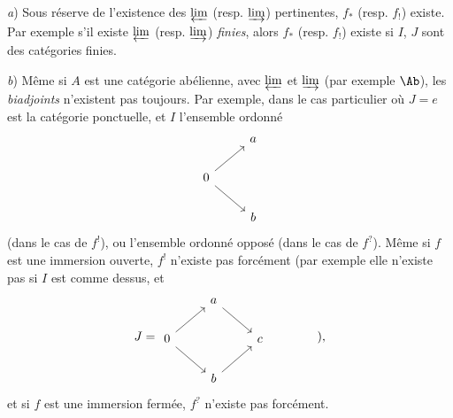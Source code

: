 \textit{a}) Sous réserve de l'existence des $\varprojlim$ (resp. $\varinjlim$) pertinentes, $f_{*}$ (resp. $f_{!}$) existe. Par exemple s'il existe $\varprojlim$ (resp. $\varinjlim$) \textit{finies}, alors $f_{*}$ (resp. $f_{!}$) existe si $I$, $J$ sont des catégories finies.

\textit{b}) Même si $A$ est une catégorie abélienne, avec $\varprojlim$ et $\varinjlim$ (par exemple $\Ab$), les \textit{biadjoints} n'existent pas toujours. Par exemple, dans le cas particulier où $J=e$ est la catégorie ponctuelle, et $I$ l'ensemble ordonné
\[
\begin{tikzcd}
 & a \\
0 \arrow[ur] \arrow[dr] & \\
 & b
\end{tikzcd}
\]
(dans le cas de $f^{!}$), ou l'ensemble ordonné opposé (dans le cas de $f^{?}$). Même si $f$ est une immersion ouverte, $f^{!}$ n'existe pas forcément (par exemple elle n'existe pas si $I$ est comme dessus, et
\[
J=\begin{tikzcd}
 & a \arrow[dr] & \\
0 \arrow[ur] \arrow[dr] & & c \\
 & b \arrow[ur] &
\end{tikzcd}
\qquad\qquad \text{),}
\]
et si $f$ est une immersion fermée, $f^{?}$ n'existe pas forcément.

